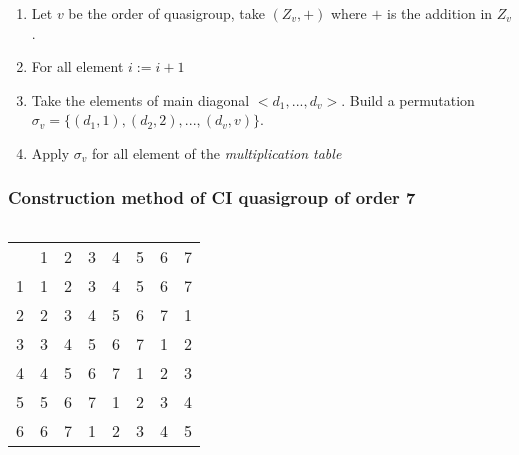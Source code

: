 \begin{frame}
\begin{enumerate}
	\item Let $v$ be the order of quasigroup, take $(Z_v,+)$ where $+$ is the addition in $Z_v$.
	\item For all element $i := i +1$
	\item Take the elements of main diagonal $<d_1,...,d_v>$. Build a permutation $\sigma_v = \{(d_1,1), (d_2,2),..., (d_v,v)\}$.
	\item Apply $\sigma_v$ for all element of the \textit{multiplication table}
\end{enumerate}
\end{frame}


\begin{frame}
\frametitle{Construction method of CI quasigroup of order 7}
\begin{columns}
	\begin{table}[]
		\begin{tabular}{cccccccc}
			& 1                      & 2                      & 3                      & 4                      & 5                      & 6                      & 7                      \\ \cline{2-8} 
			\multicolumn{1}{l|}{1} & \multicolumn{1}{l|}{1} & \multicolumn{1}{l|}{2} & \multicolumn{1}{l|}{3} & \multicolumn{1}{l|}{4} & \multicolumn{1}{l|}{5} & \multicolumn{1}{l|}{6} & \multicolumn{1}{l|}{7} \\ \cline{2-8} 
			\multicolumn{1}{l|}{2} & \multicolumn{1}{l|}{2} & \multicolumn{1}{l|}{3} & \multicolumn{1}{l|}{4} & \multicolumn{1}{l|}{5} & \multicolumn{1}{l|}{6} & \multicolumn{1}{l|}{7} & \multicolumn{1}{l|}{1} \\ \cline{2-8} 
			\multicolumn{1}{l|}{3} & \multicolumn{1}{l|}{3} & \multicolumn{1}{l|}{4} & \multicolumn{1}{l|}{5} & \multicolumn{1}{l|}{6} & \multicolumn{1}{l|}{7} & \multicolumn{1}{l|}{1} & \multicolumn{1}{l|}{2} \\ \cline{2-8} 
			\multicolumn{1}{l|}{4} & \multicolumn{1}{l|}{4} & \multicolumn{1}{l|}{5} & \multicolumn{1}{l|}{6} & \multicolumn{1}{l|}{7} & \multicolumn{1}{l|}{1} & \multicolumn{1}{l|}{2} & \multicolumn{1}{l|}{3} \\ \cline{2-8} 
			\multicolumn{1}{l|}{5} & \multicolumn{1}{l|}{5} & \multicolumn{1}{l|}{6} & \multicolumn{1}{l|}{7} & \multicolumn{1}{l|}{1} & \multicolumn{1}{l|}{2} & \multicolumn{1}{l|}{3} & \multicolumn{1}{l|}{4} \\ \cline{2-8} 
			\multicolumn{1}{l|}{6} & \multicolumn{1}{l|}{6} & \multicolumn{1}{l|}{7} & \multicolumn{1}{l|}{1} & \multicolumn{1}{l|}{2} & \multicolumn{1}{l|}{3} & \multicolumn{1}{l|}{4} & \multicolumn{1}{l|}{5} \\ \cline{2-8} 

\end{tabular}
\end{table}
\end{columns}
\end{frame}
